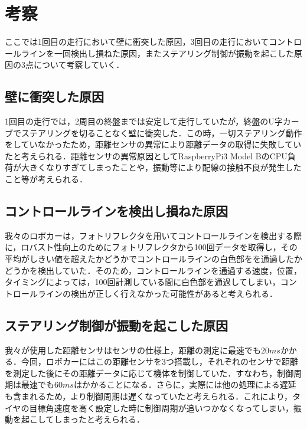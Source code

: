 \section{考察}
ここでは1回目の走行において壁に衝突した原因，3回目の走行においてコントロールラインを一回検出し損ねた原因，またステアリング制御が振動を起こした原因の3点について考察していく．

\subsection{壁に衝突した原因}
1回目の走行では，2周目の終盤までは安定して走行していたが，終盤のU字カーブでステアリングを切ることなく壁に衝突した．この時，一切ステアリング動作をしていなかったため，距離センサの異常により距離データの取得に失敗していたと考えられる．距離センサの異常原因としてRaspberryPi3 Model BのCPU負荷が大きくなりすぎてしまったことや，振動等により配線の接触不良が発生したこと等が考えられる．

\subsection{コントロールラインを検出し損ねた原因}
我々のロボカーは，フォトリフレクタを用いてコントロールラインを検出する際に，ロバスト性向上のためにフォトリフレクタから100回データを取得し，その平均がしきい値を超えたかどうかでコントロールラインの白色部をを通過したかどうかを検出していた．そのため，コントロールラインを通過する速度，位置，タイミングによっては，100回計測している間に白色部を通過してしまい，コントロールラインの検出が正しく行えなかった可能性があると考えられる．

\subsection{ステアリング制御が振動を起こした原因}
我々が使用した距離センサはセンサの仕様上，距離の測定に最速でも$20\unit{ms}$かかる．今回，ロボカーにはこの距離センサを3つ搭載し，それぞれのセンサで距離を測定した後にその距離データに応じて機体を制御していた．すなわち，制御周期は最速でも$60\unit{ms}$はかかることになる．さらに，実際には他の処理による遅延も含まれるため，より制御周期は遅くなっていたと考えられる．これにより，タイヤの目標角速度を高く設定した時に制御周期が追いつかなくなってしまい，振動を起こしてしまったと考えられる．